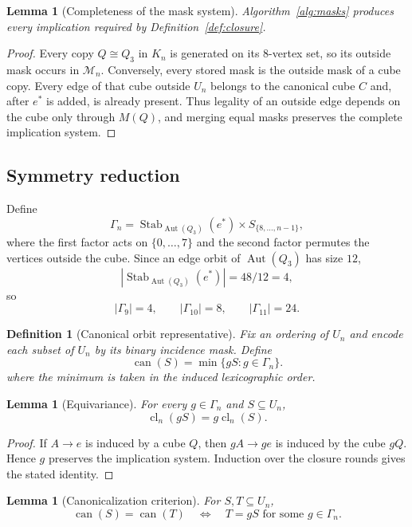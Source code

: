 \documentclass[11pt]{article}
\numberwithin{equation}{section}
\newtheorem{lemma}[theorem]{Lemma}
\newtheorem{definition}[theorem]{Definition}
\newcommand{\cl}{\operatorname{cl}}
\newcommand{\Aut}{\operatorname{Aut}}
\newcommand{\Stab}{\operatorname{Stab}}
\begin{document}
\begin{lemma}[Completeness of the mask system]\label{lem:masks}
Algorithm~\ref{alg:masks} produces every implication required by
Definition~\ref{def:closure}.
\end{lemma}

\begin{proof}
Every copy $Q\cong Q_3$ in $K_n$ is generated on its $8$-vertex set, so its
outside mask occurs in $\mathcal M_n$. Conversely, every stored mask is the
outside mask of a cube copy. Every edge of that cube outside $U_n$ belongs to the canonical cube $C$ and,
after $e^*$ is added, is already present. Thus legality of an outside edge
depends on the cube only through $M(Q)$, and merging equal masks preserves
the complete implication system.
\end{proof}

\subsection{Symmetry reduction}
Define
\[
\Gamma_n=
\Stab_{\Aut(Q_3)}(e^*)\times S_{\{8,\ldots,n-1\}},
\tag{3.8}
\]
where the first factor acts on $\{0,\ldots,7\}$ and the second factor permutes the vertices outside the cube. Since an edge orbit of $\Aut(Q_3)$ has size $12$,
\[
|\Stab_{\Aut(Q_3)}(e^*)|=48/12=4,
\]
so
\[
|\Gamma_9|=4,\qquad |\Gamma_{10}|=8,\qquad |\Gamma_{11}|=24.
\tag{3.9}
\]

\begin{definition}[Canonical orbit representative]\label{def:can}
Fix an ordering of $U_n$ and encode each subset of $U_n$ by its binary incidence
mask. Define
\[
\operatorname{can}(S)=\min\{gS:g\in\Gamma_n\}.
\tag{3.10}
\]
where the minimum is taken in the induced lexicographic order.
\end{definition}

\begin{lemma}[Equivariance]\label{lem:equiv}
For every $g\in\Gamma_n$ and $S\subseteq U_n$,
\[
\cl_n(gS)=g\cl_n(S).
\]
\end{lemma}

\begin{proof}
If $A\to e$ is induced by a cube $Q$, then $gA\to ge$ is induced by the
cube $gQ$. Hence $g$ preserves the implication system. Induction over the
closure rounds gives the stated identity.
\end{proof}

\begin{lemma}[Canonicalization criterion]\label{lem:can}
For $S,T\subseteq U_n$,
\[
\operatorname{can}(S)=\operatorname{can}(T)
\quad\Longleftrightarrow\quad
T=gS\text{ for some }g\in\Gamma_n.
\]
\end{lemma}
\end{document}

